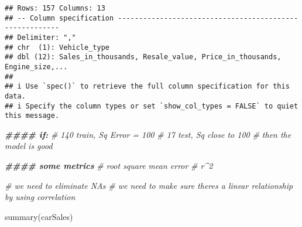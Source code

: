 \documentclass[
]{article}
\newenvironment{Shaded}{\begin{snugshade}}{\end{snugshade}}
\newcommand{\CommentTok}[1]{\textcolor[rgb]{0.56,0.35,0.01}{\textit{#1}}}
\newcommand{\DocumentationTok}[1]{\textcolor[rgb]{0.56,0.35,0.01}{\textbf{\textit{#1}}}}
\newcommand{\FunctionTok}[1]{\textcolor[rgb]{0.00,0.00,0.00}{#1}}
\newcommand{\NormalTok}[1]{#1}
\begin{document}
\begin{verbatim}
## Rows: 157 Columns: 13
## -- Column specification --------------------------------------------------------
## Delimiter: ","
## chr  (1): Vehicle_type
## dbl (12): Sales_in_thousands, Resale_value, Price_in_thousands, Engine_size,...
## 
## i Use `spec()` to retrieve the full column specification for this data.
## i Specify the column types or set `show_col_types = FALSE` to quiet this message.
\end{verbatim}

\begin{Shaded}
\begin{Highlighting}[]
\DocumentationTok{\#\#\#\# if:}
\CommentTok{\#\textquotesingle{} 140 train, Sq Error = 100}
\CommentTok{\#\textquotesingle{} 17 test, Sq close to 100}
\CommentTok{\#\textquotesingle{} then the model is good}

\DocumentationTok{\#\#\#\# some metrics}
\CommentTok{\# root square mean error}
\CommentTok{\# r\^{}2}

\CommentTok{\# we need to eliminate NAs}
\CommentTok{\# we need to make sure there\textquotesingle{}s a linear relationship by using correlation}

\FunctionTok{summary}\NormalTok{(carSales)}
\end{Highlighting}
\end{Shaded}
\end{document}
